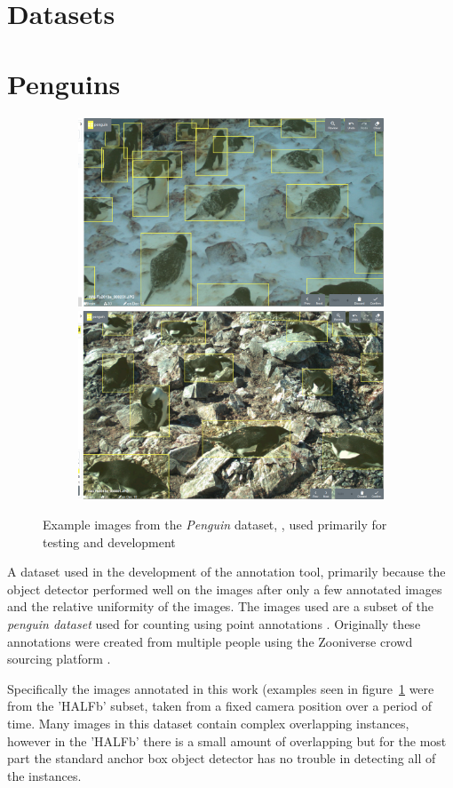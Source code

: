 \section {Datasets}
\label{sec:datasets}

\section{Penguins}

\begin{figure}[h!]
\centering
\begin{subfigure}[t]{1.0\linewidth}
  \includegraphics[width=0.475\linewidth]{figures/annotation/screenshots/penguins.png}
  \hfill
  \includegraphics[width=0.475\linewidth]{figures/annotation/screenshots/penguins2.png}
\end{subfigure}

\caption{Example images from the \emph{Penguin} dataset, \cite{PenguinData}, used primarily for testing and development}
\label{fig:penguin_dataset}
\end{figure}

A dataset used in the development of the annotation tool, primarily because the object detector performed well on the images after only a few annotated images and the relative uniformity of the images. The images used are a subset of the \emph{penguin dataset} \cite{PenguinData} used for counting using point annotations \cite{Arteta2016}. Originally these annotations were created from multiple people using the Zooniverse crowd sourcing platform \cite{Zooniverse}. 

Specifically the images annotated in this work (examples seen in figure~\ref{fig:penguin_dataset} were from the 'HALFb' subset, taken from a fixed camera position over a period of time. Many images in this dataset contain complex overlapping instances, however in the 'HALFb' there is a small amount of overlapping but for the most part the standard anchor box object detector has no trouble in detecting all of the instances.


